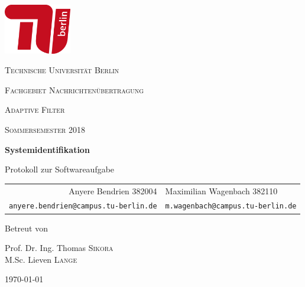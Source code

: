 \begin{titlepage}
    \centering
    \includegraphics[height=62pt]{tu_red.png}\par
    {\scshape\huge Technische Universität Berlin \par}
    {\scshape\Large Fachgebiet Nachrichtenübertragung\par}
    \vspace{1.5cm}
    {\scshape\LARGE Adaptive Filter\par}
    {\scshape\small Sommersemester 2018\par}
    \vspace{1.5cm}

    {\Huge\bfseries {Systemidentifikation}\par}
    \vspace{0.1cm}
    {\large Protokoll zur Softwareaufgabe\par}
    \vspace{1cm}

    {\itshape
        \begin{tabular}{rl}
          Anyere Bendrien 382004 &
          Maximilian Wagenbach 382110 \\
          \vspace{0.2cm}
          \small \texttt{anyere.bendrien@campus.tu-berlin.de} &
          \small \texttt{m.wagenbach@campus.tu-berlin.de}
        \end{tabular}
    }
    \vfill
    
    Betreut von\par
    Prof. Dr. Ing. Thomas \textsc{Sikora} \\
    M.Sc. Lieven \textsc{Lange}
    \vspace{1cm}
    
    {\large \today\par}
\end{titlepage}